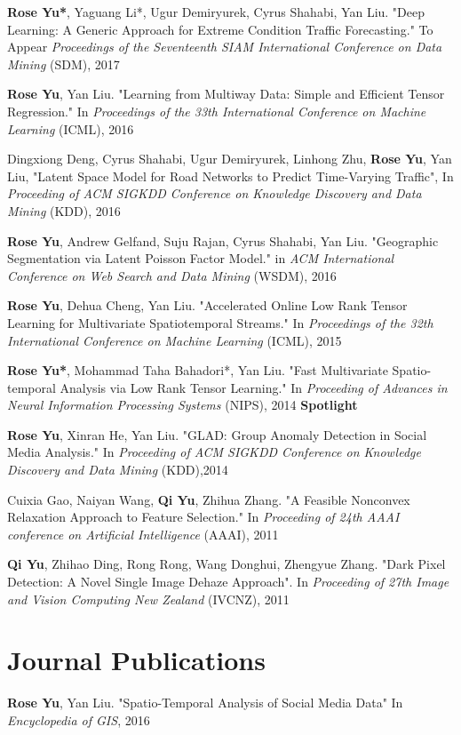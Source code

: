 \documentclass[margin,line]{res}
\begin{document}
\begin{resume}
{\bf Rose Yu*}, Yaguang Li*, Ugur Demiryurek, Cyrus Shahabi, Yan Liu. "Deep Learning: A Generic Approach for Extreme Condition Traffic Forecasting." To Appear \textit{Proceedings  of the Seventeenth SIAM International Conference on Data Mining }(SDM),   2017

{\bf Rose Yu}, Yan Liu. "Learning from Multiway Data: Simple and Efficient Tensor Regression." In \textit{Proceedings  of the 33th International Conference on Machine Learning }(ICML),   2016

Dingxiong Deng, Cyrus Shahabi, Ugur Demiryurek, Linhong Zhu, {\bf Rose Yu}, Yan Liu, 
"Latent Space Model for Road Networks to Predict Time-Varying Traffic", In \textit{Proceeding of ACM SIGKDD Conference on Knowledge Discovery and Data Mining } (KDD), 2016


{\bf Rose Yu}, Andrew Gelfand, Suju Rajan, Cyrus Shahabi, Yan Liu. "Geographic Segmentation via Latent Poisson Factor Model." in \textit{ACM International Conference on Web Search and Data Mining} (WSDM), 2016 

{\bf Rose Yu}, Dehua Cheng, Yan Liu. "Accelerated Online Low Rank Tensor Learning for Multivariate Spatiotemporal Streams." In \textit{Proceedings  of the 32th International Conference on Machine Learning} (ICML), 2015

{\bf Rose Yu*}, Mohammad Taha Bahadori*, Yan Liu. "Fast Multivariate Spatio-temporal Analysis via Low Rank Tensor Learning." In \textit{Proceeding of Advances in Neural Information Processing Systems} (NIPS), 2014 \textbf{Spotlight}

{\bf Rose Yu}, Xinran He, Yan Liu. "GLAD: Group Anomaly Detection in Social Media Analysis." In \textit{Proceeding of ACM SIGKDD Conference on Knowledge Discovery and Data Mining} (KDD),2014

Cuixia Gao, Naiyan Wang, {\bf Qi Yu}, Zhihua Zhang. "A Feasible Nonconvex Relaxation Approach to Feature Selection." In \textit{Proceeding of 24th AAAI conference on Artificial Intelligence} (AAAI), 2011 

{\bf Qi Yu}, Zhihao Ding, Rong Rong, Wang Donghui, Zhengyue Zhang. "Dark Pixel Detection: A Novel Single Image Dehaze Approach". In \textit{Proceeding of 27th Image and Vision Computing New Zealand }(IVCNZ), 2011  

 
\section{\sc Journal Publications}
{\bf Rose Yu},  Yan Liu.  "Spatio-Temporal Analysis of Social Media Data"  In \textit{Encyclopedia of GIS}, 2016


\end{resume}
\end{document}
